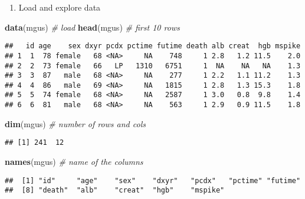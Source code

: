 \documentclass[]{book}
\newenvironment{Shaded}{\begin{snugshade}}{\end{snugshade}}
\newcommand{\KeywordTok}[1]{\textcolor[rgb]{0.13,0.29,0.53}{\textbf{{#1}}}}
\newcommand{\CommentTok}[1]{\textcolor[rgb]{0.56,0.35,0.01}{\textit{{#1}}}}
\newcommand{\NormalTok}[1]{{#1}}
\providecommand{\tightlist}{%
  \setlength{\itemsep}{0pt}\setlength{\parskip}{0pt}}
\theoremstyle{definition}
\theoremstyle{definition}
\theoremstyle{definition}
\theoremstyle{remark}
\begin{document}
\begin{enumerate}
\def\labelenumi{\arabic{enumi}.}
\tightlist
\item
  Load and explore data
\end{enumerate}

\begin{Shaded}
\begin{Highlighting}[]
\KeywordTok{data}\NormalTok{(mgus)                                                                }\CommentTok{# load}
\KeywordTok{head}\NormalTok{(mgus)                                                       }\CommentTok{# first 10 rows}
\end{Highlighting}
\end{Shaded}

\begin{verbatim}
##   id age    sex dxyr pcdx pctime futime death alb creat  hgb mspike
## 1  1  78 female   68 <NA>     NA    748     1 2.8   1.2 11.5    2.0
## 2  2  73 female   66   LP   1310   6751     1  NA    NA   NA    1.3
## 3  3  87   male   68 <NA>     NA    277     1 2.2   1.1 11.2    1.3
## 4  4  86   male   69 <NA>     NA   1815     1 2.8   1.3 15.3    1.8
## 5  5  74 female   68 <NA>     NA   2587     1 3.0   0.8  9.8    1.4
## 6  6  81   male   68 <NA>     NA    563     1 2.9   0.9 11.5    1.8
\end{verbatim}

\begin{Shaded}
\begin{Highlighting}[]
\KeywordTok{dim}\NormalTok{(mgus)                                              }\CommentTok{# number of rows and cols}
\end{Highlighting}
\end{Shaded}

\begin{verbatim}
## [1] 241  12
\end{verbatim}

\begin{Shaded}
\begin{Highlighting}[]
\KeywordTok{names}\NormalTok{(mgus)                                                }\CommentTok{# name of the columns}
\end{Highlighting}
\end{Shaded}

\begin{verbatim}
##  [1] "id"     "age"    "sex"    "dxyr"   "pcdx"   "pctime" "futime"
##  [8] "death"  "alb"    "creat"  "hgb"    "mspike"
\end{verbatim}
\end{document}
